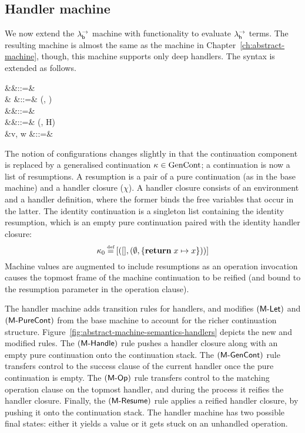\documentclass[12pt,phd,lfcs,twoside,openright,logo,leftchapter,normalheadings]{infthesis}
\theoremstyle{plain}
\theoremstyle{definition}
\begin{document}
\subsection{Handler machine}
\label{sec:handler-machine}
\newcommand{\HClosure}{\dec{HClo}}
%
We now extend the $\lambda^\rightarrow_{\mathsf{b}}$ machine with functionality to evaluate
$\lambda^\rightarrow_{\mathsf{h}}$ terms. The resulting machine is almost the same as the machine
in Chapter~\ref{ch:abstract-machine}, though, this machine supports
only deep handlers.
%
The syntax is extended as follows.
%
{
\begin{syntax}
              &\conf \in \Conf &::=& \\
                 &\rho \in {} &::=& (\sigma, \chi)\\
               &\kappa \in \MGContCat &::=& \nil \mid \rho \cons \kappa\\
   &\chi \in \MGFrameCat  &::=& (\env, H) \\
     &v, w \in \MValCat  &::=& \cdots \mid \rho \\
\end{syntax}}%
%
The notion of configurations changes slightly in that the continuation
component is replaced by a generalised continuation
$\kappa \in \textrm{GenCont}$; a continuation is now a list of
resumptions. A resumption is a pair of a pure continuation (as in the
base machine) and a handler closure ($\chi$).
%
A handler closure consists of an environment and a handler definition,
where the former binds the free variables that occur in the latter.
%
The identity continuation is a singleton list containing the identity
resumption, which is an empty pure continuation paired with the
identity handler closure:
%
{
\[
\kappa_0 \defas [(\nil, (\emptyset, \{\Return\;x \mapsto x\}))]
\]}%
%
Machine values are augmented to include resumptions as an operation
invocation causes the topmost frame of the machine continuation to be
reified (and bound to the resumption parameter in the operation
clause).
%

The handler machine adds transition rules for handlers, and modifies
$(\mathsf{M\textrm{-}Let})$ and $(\mathsf{M\textrm{-}PureCont})$ from the base machine to account
for the richer continuation
structure. Figure~\ref{fig:abstract-machine-semantics-handlers}
depicts the new and modified rules.
%
The $(\mathsf{M\textrm{-}Handle})$ rule pushes a handler closure along with an
empty pure continuation onto the continuation stack.
%
The $(\mathsf{M\textrm{-}GenCont})$ rule transfers control to the success clause
of the current handler once the pure continuation is empty.
%
The $(\mathsf{M\textrm{-}Op})$ rule transfers control to the matching
operation clause on the topmost handler, and during the process it
reifies the handler closure. Finally, the $(\mathsf{M\textrm{-}Resume})$ rule
applies a reified handler closure, by pushing it onto the continuation
stack.
%
The handler machine has two possible final states: either it yields a
value or it gets stuck on an unhandled operation.
\end{document}
